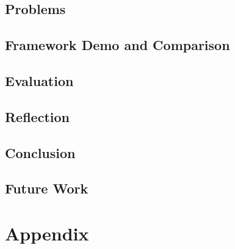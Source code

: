 \chapter{Problems}




\chapter{Framework Demo and Comparison}








\chapter{Evaluation}




\chapter{Reflection}


\chapter{Conclusion}


\chapter{Future Work}


\printbibliography

\part{Appendix}
\appendix


